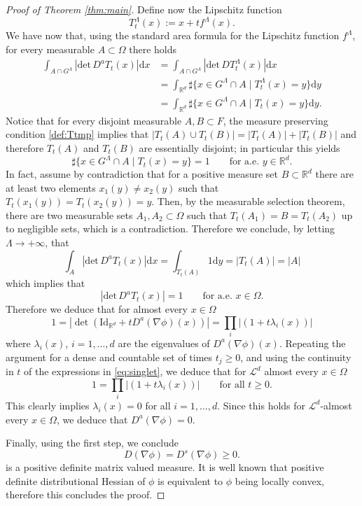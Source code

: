 \documentclass[11pt, twoside, reqno]{amsart}
\newcounter{assu}
\theoremstyle{definition} \newtheorem{definition}{Definition}[section]
\theoremstyle{definition} \newtheorem{remark}[definition]{Remark}
\theoremstyle{plain} \newtheorem{lemma}[definition]{Lemma}
\theoremstyle{plain} \newtheorem{proposition}[definition]{Proposition}
\theoremstyle{plain} \newtheorem{theorem}[definition]{Theorem}
\theoremstyle{plain} \newtheorem{corollary}[definition]{Corollary}
\theoremstyle{definition} \newtheorem{example}[definition]{Example}
\theoremstyle{plain} \newtheorem{claim}[clai]{Claim}
\theoremstyle{definition} \newtheorem{assumption}[definition]{Assumption}
\newcommand{\1}{\mathbbm 1}
\numberwithin{equation}{section} %
\theoremstyle{plain} \newtheorem*{theorem*}{Theorem}
\theoremstyle{plain} \newtheorem{mthm}[maintheorem]{Main Theorem}
\theoremstyle{plain} \newtheorem*{mthm*}{Main Theorem}
\theoremstyle{plain} \newtheorem*{conjecture*}{Conjecture}
\theoremstyle{plain} \newtheorem{conjecture}[definition]{Conjecture}
\theoremstyle{plain} \newtheorem*{problem*}{Problem}
\begin{document}
\begin{proof}[Proof of Theorem \ref{thm:main}]
Define now the Lipschitz function 
$$
T_t^\Lambda(x) := x + t f^\Lambda(x).
$$
We have now that, using the standard area formula for the Lipschitz function $f^\Lambda$, for every measurable $A \subset \Omega$ there holds
\begin{equation}\label{eq:multeplicity}
\begin{aligned}
    \int_{A \cap G^\Lambda}|\mathrm{det} \, D^a T_t(x)| \mathrm{d} x & =  \int_{A \cap G^\Lambda} |\mathrm{det} \, DT^\Lambda_t(x)| \mathrm{d} x \\
    & = \int_{\mathbb R^d}  \sharp \{ x \in G^\Lambda\cap A \; | \; T_t^\Lambda(x) = y \} \mathrm{d} y\\
    & = \int_{\mathbb R^d}  \sharp \{ x \in G^\Lambda\cap A \; | \; T_t(x) = y \} \mathrm{d} y.
    \end{aligned}
\end{equation}
Notice that for every disjoint measurable $A, B \subset F$, the measure preserving condition \eqref{def:Ttmp} implies that $|T_t(A) \cup T_t(B) | = |T_t(A)| + |T_t(B)|$ and therefore $T_t(A)$ and $T_t(B)$ are essentially disjoint; in particular this yields 
$$
\sharp \{ x \in G^\Lambda\cap A \; | \; T_t(x) = y \} = 1 \qquad \text{for a.e. $y \in \mathbb R^d$}.
$$
In fact, assume by contradiction that for a positive measure set $B \subset \mathbb R^d$ there are at least two elements $x_1(y) \neq x_2(y)$ such that $T_t(x_1(y)) = T_t(x_2(y)) = y$. Then, by the measurable selection theorem, there are two measurable sets $A_1, A_2 \subset \Omega$ such that $T_t(A_1) = B = T_t(A_2)$ up to negligible sets, which is a contradiction.
Therefore we conclude, by letting $\Lambda \to +\infty$, that 
$$
\int_{A}|\mathrm{det} \, D^a T_t(x)| \mathrm{d} x  = \int_{T_t(A)}  1 \mathrm{d} y = |T_t(A)| = |A|
$$
which implies that 
$$
|\mathrm{det} \, D^a T_t(x)| = 1 \qquad \text{for a.e. $x \in \Omega$}.
$$
Therefore we deduce that for almost every $x \in \Omega$
\begin{equation}\label{eq:singlet}
   1 =  | \det (\mathrm{Id}_{\mathbb R^d} + t D^a(\nabla \phi)(x))| = \prod_{i} |(1+ t \lambda_i(x))|
\end{equation}
where $\lambda_i(x)$, $i = 1,\ldots, d$ are the eigenvalues of $D^a(\nabla \phi)(x)$. Repeating the argument for a dense and countable set of times $t_j \geq 0$, and using the continuity in $t$ of the expressions in \eqref{eq:singlet}, we deduce that for $\mathscr L^d$ almost every $x \in \Omega$
\begin{equation}
   1  = \prod_{i} |(1+ t \lambda_i(x))| \qquad \text{for all $t \geq 0$}.
\end{equation}
This clearly implies $\lambda_i(x) = 0$ for all $i = 1, \ldots, d$. Since this holds for $\mathscr L^d$-almost every $x \in \Omega$, we deduce that $D^a(\nabla \phi) = 0$.


\vspace{0.3cm}
Finally, using the first step, we conclude 
$$
D(\nabla  \phi) = D^s(\nabla \phi) \geq 0.
$$
is a positive definite matrix valued measure. It is well known that positive definite distributional Hessian of $\phi$ is equivalent to $\phi$ being locally convex, therefore this concludes the proof.
\end{proof}
\end{document}

